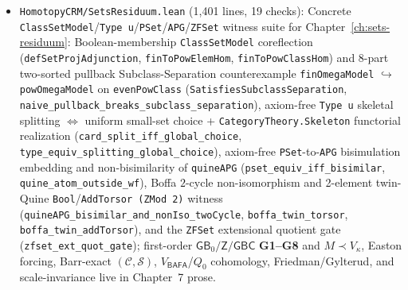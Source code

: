 \documentclass[10pt,twoside,openright]{book}
\theoremstyle{crmplain}
\theoremstyle{crmdef}
\theoremstyle{crmremark}
\begin{document}
\begin{itemize}[leftmargin=1.5em]
  \item \texttt{HomotopyCRM/\allowbreak SetsResiduum.lean} (1,401 lines, 19 checks): Concrete \texttt{ClassSetModel}/\allowbreak\texttt{Type u}/\allowbreak\texttt{PSet}/\allowbreak\texttt{APG}/\allowbreak\texttt{ZFSet} witness suite for Chapter~\ref{ch:sets-residuum}: Boolean-membership \texttt{Class\allowbreak Set\allowbreak Model} coreflection (\texttt{def\allowbreak Set\allowbreak Proj\allowbreak Adjunction}, \texttt{finToPowElemHom}, \texttt{finToPowClassHom}) and 8-part two-sorted pullback Subclass-Separation counterexample \texttt{fin\allowbreak Omega\allowbreak Model} $\hookrightarrow$ \texttt{pow\allowbreak Omega\allowbreak Model} on \texttt{evenPowClass} (\texttt{Satisfies\allowbreak Subclass\allowbreak Separation}, \texttt{naive\_\allowbreak pullback\_\allowbreak breaks\_\allowbreak subclass\_\allowbreak separation}), axiom-free \texttt{Type u} skeletal splitting $\iff$ uniform small-set choice + \texttt{CategoryTheory.Skeleton} functorial realization (\texttt{card\_\allowbreak split\_\allowbreak iff\_\allowbreak global\_\allowbreak choice}, \texttt{type\_\allowbreak equiv\_\allowbreak splitting\_\allowbreak global\_\allowbreak choice}), axiom-free \texttt{PSet}-to-\texttt{APG} bisimulation embedding and non-bisimilarity of \texttt{quineAPG} (\texttt{pset\_\allowbreak equiv\_\allowbreak iff\_\allowbreak bisimilar}, \texttt{quine\_\allowbreak atom\_\allowbreak outside\_\allowbreak wf}), Boffa $2$-cycle non-isomorphism and 2-element twin-Quine \texttt{Bool}/\allowbreak\texttt{AddTorsor (ZMod 2)} witness (\texttt{quineAPG\_\allowbreak bisimilar\_\allowbreak and\_\allowbreak nonIso\_\allowbreak twoCycle}, \texttt{boffa\_\allowbreak twin\_\allowbreak torsor}, \texttt{boffa\_\allowbreak twin\_\allowbreak addTorsor}), and the \texttt{ZFSet} extensional quotient gate (\texttt{zfset\_\allowbreak ext\_\allowbreak quot\_\allowbreak gate}); first-order $\mathsf{GB}_0/\mathsf{Z}/\mathsf{GBC}$ \textbf{G1--G8} and $M \prec V_\kappa$, Easton forcing, Barr-exact $(\mathcal{C}, \mathcal{S})$, $V_{\mathsf{BAFA}}$/$Q_0$ cohomology, Friedman/Gylterud, and scale-invariance live in Chapter~7 prose.

\end{itemize}
\end{document}
